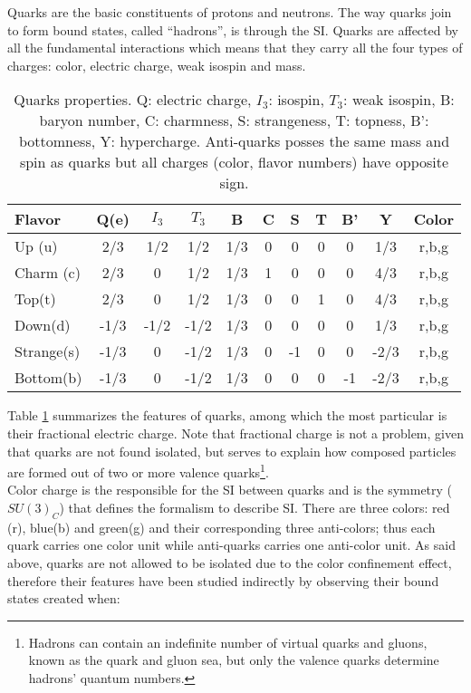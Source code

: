 \noindent Quarks are the basic constituents of protons and neutrons. The way quarks join to form bound states, called ``hadrons'', is through the SI. Quarks are affected by all the fundamental interactions which means that they carry all the four types of charges: color, electric charge, weak isospin and mass.

\begin{center}
\begin{table}[h!]
\centering
\footnotesize
\begin{tabular}{lcccccccccc} \hline
Flavor     & Q(e) & $I_3$ & $T_3$  & B   & C & S  & T & B'  & Y    & Color \\ \hline
Up (u)     & 2/3  & 1/2   &  1/2   & 1/3 & 0 & 0  & 0 & 0   & 1/3  & r,b,g \\ %
Charm (c)  & 2/3  & 0     &  1/2   & 1/3 & 1 & 0  & 0 & 0   & 4/3  & r,b,g \\ %
Top(t)     & 2/3  & 0     &  1/2   & 1/3 & 0 & 0  & 1 & 0   & 4/3  & r,b,g \\ \hline
Down(d)    & -1/3 & -1/2  & -1/2   & 1/3 & 0 & 0  & 0 & 0   & 1/3  & r,b,g \\ %
Strange(s) & -1/3 & 0     & -1/2   & 1/3 & 0 & -1 & 0 & 0   & -2/3 & r,b,g \\ %
Bottom(b)  & -1/3 & 0     & -1/2   & 1/3 & 0 & 0  & 0 & -1  & -2/3 & r,b,g \\ \hline
\end{tabular}
\caption[Quarks properties.]{Quarks properties\cite{pdg}. Q: electric charge, $I_3$: isospin, $T_3$: weak isospin, B: baryon number, C: charmness, S: strangeness, T: topness, B': bottomness, Y: hypercharge. Anti-quarks posses the same mass and spin as quarks but all charges (color, flavor numbers) have opposite sign.}\label{quarks}
\end{table}
\end{center}

\noindent Table \ref{quarks} summarizes the features of quarks, among which the most particular is their fractional electric charge. Note that fractional charge is not a problem, given that quarks are not found isolated, but serves to explain how composed particles are formed out of two or more valence quarks\footnote{Hadrons can contain an indefinite number of virtual quarks and gluons, known as the quark and gluon sea, but only the valence quarks determine hadrons' quantum numbers.}.\\

\noindent Color charge is the responsible for the SI between quarks and is the symmetry ($SU(3)_C$) that defines the formalism to describe SI. There are three colors: red (r), blue(b) and green(g) and their corresponding three anti-colors; thus each quark carries one color unit while anti-quarks carries one anti-color unit. As said above, quarks are not allowed to be isolated due to the color confinement effect, therefore their features have been studied indirectly by observing their bound states created when:

